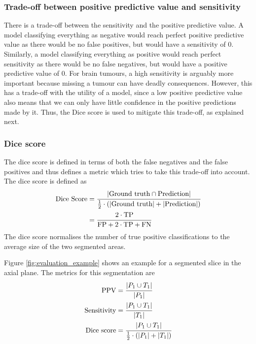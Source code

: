 \documentclass[12pt,a4paper,twoside,openright]{report}
\begin{document}
\subsubsection{Trade-off between positive predictive value and sensitivity }
There is a trade-off between the sensitivity and the positive predictive value. A model classifying everything as negative would reach perfect positive predictive value as there would be no false positives, but would have a sensitivity of 0. Similarly, a model classifying everything as positive would reach perfect sensitivity as there would be no false negatives, but would have a positive predictive value of 0. For brain tumours, a high sensitivity is arguably more important because missing a tumour can have deadly consequences. However, this has a trade-off with the utility of a model, since a low positive predictive value also means that we can only have little confidence in the positive predictions made by it. Thus, the Dice score is used to mitigate this trade-off, as explained next.

\subsubsection{Dice score}
The dice score is defined in terms of both the false negatives and the false positives and thus defines a metric which tries to take this trade-off into account. The dice score is defined as
\begin{equation}
\begin{split}
	\textrm{Dice Score} & = \cfrac{\vert \textrm{Ground truth} \cap \textrm{Prediction}\vert}{\frac{1}{2} \cdot (\vert \textrm{Ground truth}\vert + \vert \textrm{Prediction}\vert)} \\
	&  = \cfrac{2 \cdot \textrm{TP}}{\textrm{FP} + 2 \cdot \textrm{TP} + \textrm{FN}}
\end{split}
\end{equation}
The dice score normalises the number of true positive classifications to the average size of the two segmented areas.

Figure \ref{fig:evaluation_example} shows an example for a segmented slice in the axial plane.  The metrics for this segmentation are
\begin{equation*}
\begin{split}
	\textrm{PPV} & = \cfrac{\vert P_1 \cup T_1 \vert}{\vert P_1 \vert} \\
	\textrm{Sensitivity} & = \cfrac{\vert P_1 \cup T_1 \vert}{\vert T_1 \vert} \\
	\textrm{Dice score} & = \cfrac{\vert P_1 \cup T_1 \vert}{\frac{1}{2} \cdot (\vert P_1 \vert + \vert T_1 \vert)} \\
\end{split}
\end{equation*}
\end{document}
